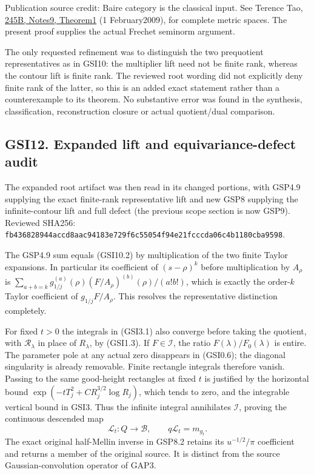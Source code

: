 Publication source credit: Baire category is the classical input. See
Terence Tao,
\href{https://terrytao.wordpress.com/2009/02/01/245b-notes-9-the-baire-category-theorem-and-its-banach-space-consequences/}{245B,
Notes9, Theorem1} (1 February2009), for complete metric spaces. The
present proof supplies the actual Frechet seminorm argument.

The only requested refinement was to distinguish the two prequotient
representatives as in GSI10: the multiplier lift need not be finite
rank, whereas the contour lift is finite rank. The reviewed root wording
did not explicitly deny finite rank of the latter, so this is an added
exact statement rather than a counterexample to its theorem. No
substantive error was found in the synthesis, classification,
reconstruction closure or actual quotient/dual comparison.

\subsection{GSI12. Expanded lift and equivariance-defect
audit}\label{gsi12.-expanded-lift-and-equivariance-defect-audit}

The expanded root artifact was then read in its changed portions, with
GSP4.9 supplying the exact finite-rank representative lift and new GSP8
supplying the infinite-contour lift and full defect (the previous scope
section is now GSP9). Reviewed SHA256:
\texttt{fb436828944accd8aac94183e729f6c55054f94e21fcccda06c4b1180cba9598}.

The GSP4.9 sum equals (GSI10.2) by multiplication of the two finite
Taylor expansions. In particular its coefficient of \((s-\rho)^k\)
before multiplication by \(A_\rho\) is
\(\sum_{a+b=k}g_{1/j}^{(a)}(\rho)(F/A_\rho)^{(b)}(\rho)/(a!b!)\), which
is exactly the order-\(k\) Taylor coefficient of \(g_{1/j}F/A_\rho\).
This resolves the representative distinction completely.

For fixed \(t>0\) the integrals in (GSI3.1) also converge before taking
the quotient, with \(\mathscr R_\lambda\) in place of \(R_\lambda\), by
(GSI1.3). If \(F\in\mathcal I\), the ratio \(F(\lambda)/F_0(\lambda)\)
is entire. The parameter pole at any actual zero disappears in (GSI0.6);
the diagonal singularity is already removable. Finite rectangle
integrals therefore vanish. Passing to the same good-height rectangles
at fixed \(t\) is justified by the horizontal bound
\(\exp(-tT_j^2+C R_j^{3/2}\log R_j)\), which tends to zero, and the
integrable vertical bound in GSI3. Thus the infinite integral
annihilates \(\mathcal I\), proving the continuous descended map \[
\mathcal L_t:Q\longrightarrow\mathcal B,
\qquad q\mathcal L_t=m_{g_t}.
\tag{GSI12.1}
\] The exact original half-Mellin inverse in GSP8.2 retains its
\(u^{-1/2}/\pi\) coefficient and returns a member of the original
source. It is distinct from the source Gaussian-convolution operator of
GAP3.

